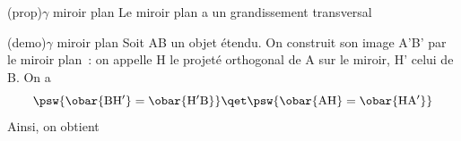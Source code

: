 \documentclass[../../main/main.tex]{subfiles}
\begin{document}
\begin{tcb*}[label=prop:mir_grand](prop){$\gamma$ miroir plan}
	Le miroir plan a un grandissement transversal
	\psw{%
		\[
			\boxed{\gamma = +1}
		\]
	}%
	\vspace{-20pt}
\end{tcb*}
\begin{tcb*}[label=demo:mir_grand, sidebyside,
		righthand ratio=.4](demo){$\gamma$ miroir plan}
	Soit AB un objet étendu. On construit son image A'B' par le miroir plan~: on
	appelle H le projeté orthogonal de A sur le miroir, H' celui de B.
	\smallbreak
	On a
	\[
		\psw{%
			\obar{\rm BH'} = \obar{\rm H'B}
		}%
		\qet
		\psw{%
			\obar{\rm AH} = \obar{\rm HA'}
		}%
	\]
	Ainsi, on obtient
	\psw{%
		\[
			\boxed{\AB = \obar{\rm HH'} = \ABp}
		\]
	}%
	\tcblower
	\begin{center}
		\label{fig:mir_plan-grand}
	\end{center}
\end{tcb*}
\end{document}

